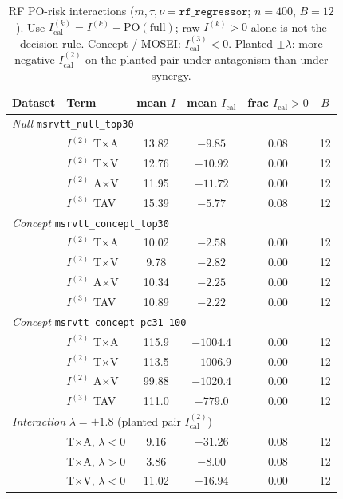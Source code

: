 \begin{table}[t]
\centering
\scriptsize
\setlength{\tabcolsep}{2.8pt}
\renewcommand{\arraystretch}{1.05}
\caption{RF PO-risk interactions ($m,\tau,\nu=\texttt{rf\_regressor}$;
$n{=}400$, $B{=}12$).
Use $I_{\mathrm{cal}}^{(k)}=I^{(k)}-\mathrm{PO}(\mathrm{full})$;
raw $I^{(k)}>0$ alone is not the decision rule.
Concept / MOSEI: $I_{\mathrm{cal}}^{(3)}<0$.
Planted $\pm\lambda$: more negative $I_{\mathrm{cal}}^{(2)}$ on the planted pair
under antagonism than under synergy.}
\label{tab:I2-I3-rf}
\begin{tabular}{llcccc}
\toprule
Dataset & Term & mean $I$ & mean $I_{\mathrm{cal}}$ & frac $I_{\mathrm{cal}}>0$ & $B$ \\
\midrule
\multicolumn{6}{l}{\emph{Null} \texttt{msrvtt\_null\_top30}} \\
 & $I^{(2)}$ T$\times$A & 13.82 & $-9.85$ & 0.08 & 12 \\
 & $I^{(2)}$ T$\times$V & 12.76 & $-10.92$ & 0.00 & 12 \\
 & $I^{(2)}$ A$\times$V & 11.95 & $-11.72$ & 0.00 & 12 \\
 & $I^{(3)}$ TAV & 15.39 & $-5.77$ & 0.08 & 12 \\
\midrule
\multicolumn{6}{l}{\emph{Concept} \texttt{msrvtt\_concept\_top30}} \\
 & $I^{(2)}$ T$\times$A & 10.02 & $-2.58$ & 0.00 & 12 \\
 & $I^{(2)}$ T$\times$V & 9.78 & $-2.82$ & 0.00 & 12 \\
 & $I^{(2)}$ A$\times$V & 10.34 & $-2.25$ & 0.00 & 12 \\
 & $I^{(3)}$ TAV & 10.89 & $-2.22$ & 0.00 & 12 \\
\midrule
\multicolumn{6}{l}{\emph{Concept} \texttt{msrvtt\_concept\_pc31\_100}} \\
 & $I^{(2)}$ T$\times$A & 115.9 & $-1004.4$ & 0.00 & 12 \\
 & $I^{(2)}$ T$\times$V & 113.5 & $-1006.9$ & 0.00 & 12 \\
 & $I^{(2)}$ A$\times$V & 99.88 & $-1020.4$ & 0.00 & 12 \\
 & $I^{(3)}$ TAV & 111.0 & $-779.0$ & 0.00 & 12 \\
\midrule
\multicolumn{6}{l}{\emph{Interaction} $\lambda{=}\pm 1.8$ (planted pair $I^{(2)}_{\mathrm{cal}}$)} \\
 & T$\times$A, $\lambda{<}0$ & 9.16 & $-31.26$ & 0.08 & 12 \\
 & T$\times$A, $\lambda{>}0$ & 3.86 & $-8.00$ & 0.08 & 12 \\
 & T$\times$V, $\lambda{<}0$ & 11.02 & $-16.94$ & 0.00 & 12 \\

\end{tabular}
\end{table}
